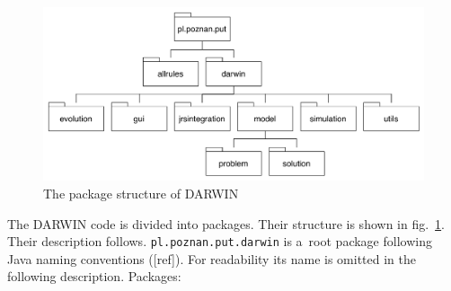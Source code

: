 \begin{figure}
  \centering \includegraphics[scale=0.45]{img/packages}
  \caption{The package structure of DARWIN}
  \label{packages}
\end{figure}

The DARWIN code is divided into packages. Their structure is shown in
fig.~\ref{packages}. Their description follows. \texttt{pl.poznan.put.darwin}
is a~root package following Java naming conventions ([ref]). For readability
its name is omitted in the following description. Packages:
